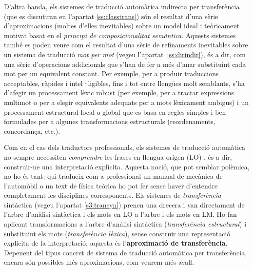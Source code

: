 D'altra banda, els sistemes de traducció automàtica indirecta per
transferència (que es discutiran en l'apartat \ref{ss:classtrans}) són
el resultat d'una sèrie d'aproximacions (moltes d'elles inevitables)
sobre un model ideal i teòricament motivat basat en el \emph{principi
  de composicionalitat semàntica}. Aquests sistemes també es poden veure
com el resultat d'una sèrie de refinaments inevitables sobre un
sistema de traducció \emph{mot per mot} (vegeu
l'apartat~\ref{ss:dirindir}), és a dir, com una sèrie d'operacions
addicionals que s'han de fer a més d'anar substituint cada mot per un
equivalent constant. Per exemple, per a produir traduccions
acceptables, ràpides i intel·ligibles, fins i tot entre llengües molt
semblants, s'ha d'afegir un processament lèxic robust (per exemple,
per a tractar expressions multimot o per a elegir equivalents adequats
per a mots lèxicament ambigus) i un processament estructural local o
global que es basa en regles simples i ben formulades per a algunes
transformacions estructurals (reordenaments, concordança,
etc.). 


Com en el cas dels traductors professionals, els sistemes de traducció
automàtica no sempre necessiten \emph{comprendre} les frases en
llengua origen (LO) , és a dir, construir-ne una interpretació
explícita. Aquesta noció, que pot semblar polèmica, no ho és tant: qui
tradueix com a professional un manual de mecànica de l'automòbil o un
text de física teòrica ho pot fer sense haver d'entendre completament
les disciplines corresponents. Els sistemes de \emph{transferència}
sintàctica (vegeu l'apartat \ref{s3:transyn}) prenen una drecera i van
directament de l'arbre d'anàlisi sintàctica i els mots en LO a l'arbre
i els mots en LM. Ho fan aplicant transformacions a l'arbre d'anàlisi
sintàctica (\emph{transferència estructural}) i substituint els mots
(\emph{transferència lèxica}), sense construir una representació
explícita de la interpretació; aquesta és l'\textbf{aproximació de
  transferència}. Depenent del tipus concret de sistema de traducció
automàtica per transferència, encara són possibles més aproximacions,
com veurem més avall.

